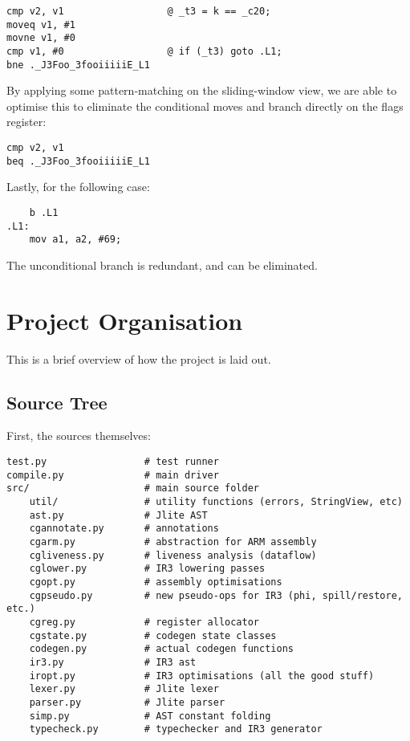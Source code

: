 \documentclass[12pt]{article}
\begin{document}
\begin{verbatim}
cmp v2, v1                  @ _t3 = k == _c20;
moveq v1, #1
movne v1, #0
cmp v1, #0                  @ if (_t3) goto .L1;
bne ._J3Foo_3fooiiiiiE_L1
\end{verbatim}

By applying some pattern-matching on the sliding-window view, we are able to optimise this to eliminate the conditional
moves and branch directly on the flags register:

\begin{verbatim}
cmp v2, v1
beq ._J3Foo_3fooiiiiiE_L1
\end{verbatim}


Lastly, for the following case:

\begin{verbatim}
	b .L1
.L1:
	mov a1, a2, #69;
\end{verbatim}

The unconditional branch is redundant, and can be eliminated.




\section{Project Organisation}

This is a brief overview of how the project is laid out.

\subsection{Source Tree}

First, the sources themselves:

\begin{verbatim}
test.py                 # test runner
compile.py              # main driver
src/                    # main source folder
	util/               # utility functions (errors, StringView, etc)
	ast.py              # Jlite AST
	cgannotate.py       # annotations
	cgarm.py            # abstraction for ARM assembly
	cgliveness.py       # liveness analysis (dataflow)
	cglower.py          # IR3 lowering passes
	cgopt.py            # assembly optimisations
	cgpseudo.py         # new pseudo-ops for IR3 (phi, spill/restore, etc.)
	cgreg.py            # register allocator
	cgstate.py          # codegen state classes
	codegen.py          # actual codegen functions
	ir3.py              # IR3 ast
	iropt.py            # IR3 optimisations (all the good stuff)
	lexer.py            # Jlite lexer
	parser.py           # Jlite parser
	simp.py             # AST constant folding
	typecheck.py        # typechecker and IR3 generator
\end{verbatim}
\end{document}
